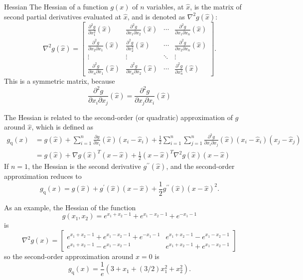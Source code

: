 \begin{definition}
    Hessian The Hessian of a function $ g(x) $ of $ n $ variables, at $ \hat{x} $, is the matrix of second partial derivatives evaluated at $ \hat{x} $, and is denoted as $ \nabla^{2} g(\hat{x}): $
$$
\nabla^{2} g(\hat{x})=\left[\begin{array}{cccc}
\frac{\partial^{2} g}{\partial x_{1}^{2}}(\hat{x}) & \frac{\partial^{2} g}{\partial x_{1} \partial x_{2}}(\hat{x}) & \cdots & \frac{\partial^{2} g}{\partial x_{1} \partial x_{n}}(\hat{x}) \\
\frac{\partial^{2} g}{\partial x_{2} \partial x_{1}}(\hat{x}) & \frac{\partial^{2} g}{\partial x_{2}^{2}}(\hat{x}) & \cdots & \frac{\partial^{2} g}{\partial x_{2} \partial x_{n}}(\hat{x}) \\
\vdots & \vdots & \ddots & \vdots \\
\frac{\partial^{2} g}{\partial x_{n} \partial x_{1}}(\hat{x}) & \frac{\partial^{2} g}{\partial x_{n} \partial x_{2}}(\hat{x}) & \cdots & \frac{\partial^{2} g}{\partial x_{n}^{2}}(\hat{x})
\end{array}\right] .
$$
This is a symmetric matrix, because
$$
\frac{\partial^{2} g}{\partial x_{i} \partial x_{j}}(\hat{x})=\frac{\partial^{2} g}{\partial x_{j} \partial x_{i}}(\hat{x})
$$
\end{definition}

The Hessian is related to the second-order (or quadratic) approximation of $ g $ around $ \hat{x} $, which is defined as
$$
\begin{aligned}
g_{\mathrm{q}}(x) &=g(\hat{x})+\sum_{i=1}^{n} \frac{\partial g}{\partial x_{i}}(\hat{x})\left(x_{i}-\hat{x}_{i}\right)+\frac{1}{2} \sum_{i=1}^{n} \sum_{j=1}^{n} \frac{\partial^{2} g}{\partial x_{i} \partial x_{j}}(\hat{x})\left(x_{i}-\hat{x}_{i}\right)\left(x_{j}-\hat{x}_{j}\right) \\
&=g(\hat{x})+\nabla g(\hat{x})^{T}(x-\hat{x})+\frac{1}{2}(x-\hat{x})^{T} \nabla^{2} g(\hat{x})(x-\hat{x})
\end{aligned}
$$
If $ n=1 $, the Hessian is the second derivative $ g^{\prime \prime}(\hat{x}) $, and the second-order approximation reduces to
$$
g_{\mathrm{q}}(x)=g(\hat{x})+g^{\prime}(\hat{x})(x-\hat{x})+\frac{1}{2} g^{\prime \prime}(\hat{x})(x-\hat{x})^{2} .
$$

\begin{example}
    As an example, the Hessian of the function
$$
g\left(x_{1}, x_{2}\right)=e^{x_{1}+x_{2}-1}+e^{x_{1}-x_{2}-1}+e^{-x_{1}-1}
$$
is
$$
\nabla^{2} g(x)=\left[\begin{array}{cc}
e^{x_{1}+x_{2}-1}+e^{x_{1}-x_{2}-1}+e^{-x_{1}-1} & e^{x_{1}+x_{2}-1}-e^{x_{1}-x_{2}-1} \\
e^{x_{1}+x_{2}-1}-e^{x_{1}-x_{2}-1} & e^{x_{1}+x_{2}-1}+e^{x_{1}-x_{2}-1}
\end{array}\right]
$$
so the second-order approximation around $ \hat{x}=0 $ is
$$
g_{\mathrm{q}}(x)=\frac{1}{e}\left(3+x_{1}+(3 / 2) x_{1}^{2}+x_{2}^{2}\right) .
$$
\end{example}

